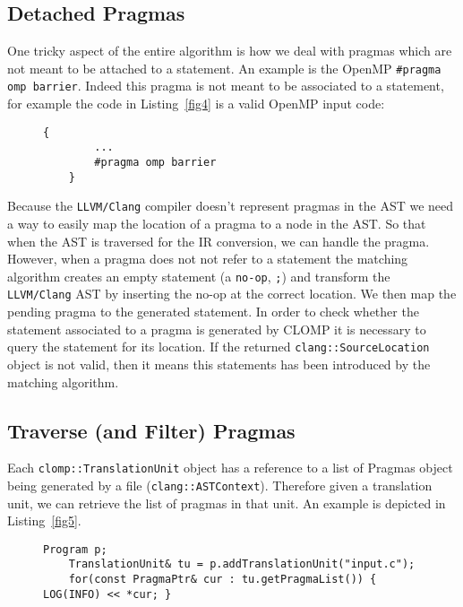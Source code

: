 \documentclass[10pt]{report}
\begin{document}
\subsection{Detached Pragmas} 
One tricky aspect of the entire algorithm is how we deal with pragmas which are
not meant to be attached to a statement. An example is the OpenMP {\tt \#pragma
omp barrier}. Indeed this pragma is not meant to be associated to a statement,
for example the code in Listing~\ref{fig4} is a valid OpenMP input code:

\begin{figure}[ht]
	\begin{lstlisting}[label=fig4,caption=An example of a positional pragma]
	{
		...
		#pragma omp barrier
	}
	\end{lstlisting}
\end{figure}

Because the {\tt LLVM/Clang} compiler doesn't represent pragmas in the AST we
need a way to easily map the location of a pragma to a node in the AST. So that
when the AST is traversed for the IR conversion, we can handle the pragma.
However, when a pragma does not not refer to a statement the matching algorithm
creates an empty statement (a {\tt no-op}, {\tt ;}) and transform the {\tt
LLVM/Clang} AST by inserting the no-op at the correct location. We then map the
pending pragma to the generated statement. In order to check whether
the statement associated to a pragma is generated by CLOMP it is necessary to
query the statement for its location. If the returned
{\tt clang::SourceLocation} object is not valid, then it means this statements
has been introduced by the matching algorithm. 

\subsection{Traverse (and Filter) Pragmas}

Each {\tt clomp::TranslationUnit} object has a reference to a list of Pragmas
object being generated by a file ({\tt clang::ASTContext}).  Therefore given a
translation unit, we can retrieve the list of pragmas in that unit. An example
is depicted in Listing~\ref{fig5}.

\begin{figure}[ht]
	\begin{lstlisting}[label=fig5,caption=Example of how to use CLOMP]
	Program p;
	TranslationUnit& tu = p.addTranslationUnit("input.c");
	for(const PragmaPtr& cur : tu.getPragmaList()) { LOG(INFO) << *cur; }
	\end{lstlisting}
\end{figure}
\end{document}

